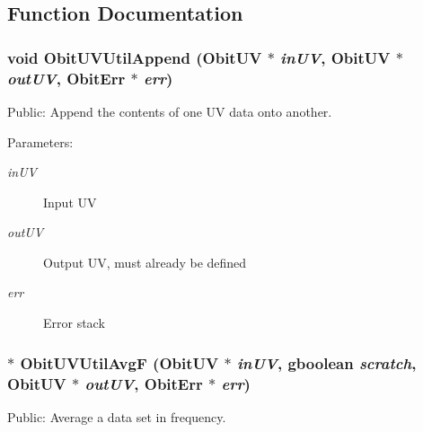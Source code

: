 \subsection{Function Documentation}
\subsubsection{\setlength{\rightskip}{0pt plus 5cm}void Obit\-UVUtil\-Append ({\bf Obit\-UV} $\ast$ {\em in\-UV}, {\bf Obit\-UV} $\ast$ {\em out\-UV}, {\bf Obit\-Err} $\ast$ {\em err})}\label{ObitUVUtil_8h_a14}


Public: Append the contents of one UV data onto another. 

\begin{Desc}
\item[Parameters:]
\begin{description}
\item[{\em in\-UV}]Input UV \item[{\em out\-UV}]Output UV, must already be defined \item[{\em err}]Error stack \end{description}
\end{Desc}
\subsubsection{$\ast$ Obit\-UVUtil\-Avg\-F ({\bf Obit\-UV} $\ast$ {\em in\-UV}, gboolean {\em scratch}, {\bf Obit\-UV} $\ast$ {\em out\-UV}, {\bf Obit\-Err} $\ast$ {\em err})}\label{ObitUVUtil_8h_a6}


Public: Average a data set in frequency. 


